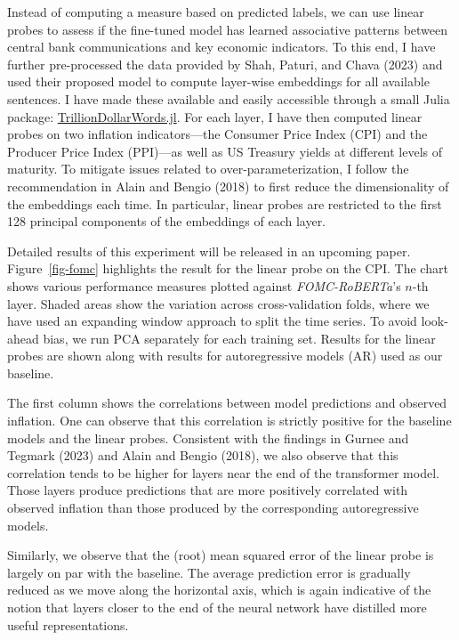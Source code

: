 \documentclass{article}
\theoremstyle{plain}
\theoremstyle{definition}
\theoremstyle{remark}
\begin{document}
Instead of computing a measure based on predicted labels, we can use
linear probes to assess if the fine-tuned model has learned associative
patterns between central bank communications and key economic
indicators. To this end, I have further pre-processed the data provided
by Shah, Paturi, and Chava (2023) and used their proposed model to
compute layer-wise embeddings for all available sentences. I have made
these available and easily accessible through a small Julia package:
\href{https://github.com/pat-alt/TrillionDollarWords.jl}{TrillionDollarWords.jl}.
For each layer, I have then computed linear probes on two inflation
indicators---the Consumer Price Index (CPI) and the Producer Price Index
(PPI)---as well as US Treasury yields at different levels of maturity.
To mitigate issues related to over-parameterization, I follow the
recommendation in Alain and Bengio (2018) to first reduce the
dimensionality of the embeddings each time. In particular, linear probes
are restricted to the first 128 principal components of the embeddings
of each layer.

Detailed results of this experiment will be released in an upcoming
paper. Figure~\ref{fig-fomc} highlights the result for the linear probe
on the CPI. The chart shows various performance measures plotted against
\emph{FOMC-RoBERTa}'s \(n\)-th layer. Shaded areas show the variation
across cross-validation folds, where we have used an expanding window
approach to split the time series. To avoid look-ahead bias, we run PCA
separately for each training set. Results for the linear probes are
shown along with results for autoregressive models (AR) used as our
baseline.

The first column shows the correlations between model predictions and
observed inflation. One can observe that this correlation is strictly
positive for the baseline models and the linear probes. Consistent with
the findings in Gurnee and Tegmark (2023) and Alain and Bengio (2018),
we also observe that this correlation tends to be higher for layers near
the end of the transformer model. Those layers produce predictions that
are more positively correlated with observed inflation than those
produced by the corresponding autoregressive models.

Similarly, we observe that the (root) mean squared error of the linear
probe is largely on par with the baseline. The average prediction error
is gradually reduced as we move along the horizontal axis, which is
again indicative of the notion that layers closer to the end of the
neural network have distilled more useful representations.
\end{document}
